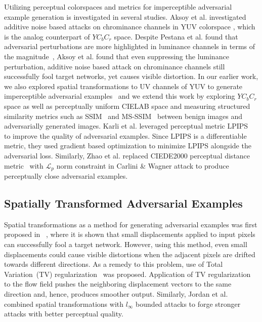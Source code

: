 Utilizing perceptual colorspaces and metrics for imperceptible adversarial example generation is investigated in several studies. Aksoy et al. investigated additive noise based attacks on chrominance channels in YUV colorspace \cite{aksoy2019attack}, which is the analog counterpart of \(YC_{b}C_{r}\) space. Despite Pestana et al. found that adversarial perturbations are more highlighted in luminance channels in terms of the magnitude~\cite{Pestana2020-hm}, Aksoy et al. found that even suppressing the luminance perturbation, additive noise based attack on chrominance channels still successfully fool target networks, yet causes visible distortion. In our earlier work, we also explored spatial transformations to UV channels of YUV to generate imperceptible adversarial examples~\cite{aydin2019imperceptible} and we extend this work by exploring \(YC_{b}C_{r}\) space as well as perceptually uniform CIELAB space and measuring structured similarity metrics such as SSIM~\cite{wang2004image} and MS-SSIM~\cite{wang2003multiscale} between benign images and adversarially generated images. Karli et al. leveraged perceptual metric LPIPS~\cite{zhang2018unreasonable} to improve the quality of adversarial examples. Since LPIPS is a differentiable metric, they used gradient based optimization to minimize LPIPS alongside the adversarial loss. Similarly, Zhao et al. replaced CIEDE2000 perceptual distance metric~\cite{luo2001development} with \(\mathcal{L}_{p}\) norm constraint in Carlini \& Wagner attack to produce perceptually close adversarial examples.

\subsection{Spatially Transformed Adversarial Examples}

Spatial transformations as a method for generating adversarial examples was first proposed in ~\cite{xiao2018spatially}, where it is shown that small displacements applied to input pixels can successfully fool a target network. However, using this method, even small displacements could cause visible distortions when the adjacent pixels are drifted towards different directions. As a remedy to this problem, use of  Total Variation~(TV) regularization~\cite{estrela2016total} was proposed. Application of TV regularization to the flow field pushes the neighboring displacement vectors to the same direction and, hence, produces smoother output. Similarly, Jordan et al. combined spatial transformations with \(l_\infty\) bounded attacks to forge stronger attacks with better perceptual quality. 

